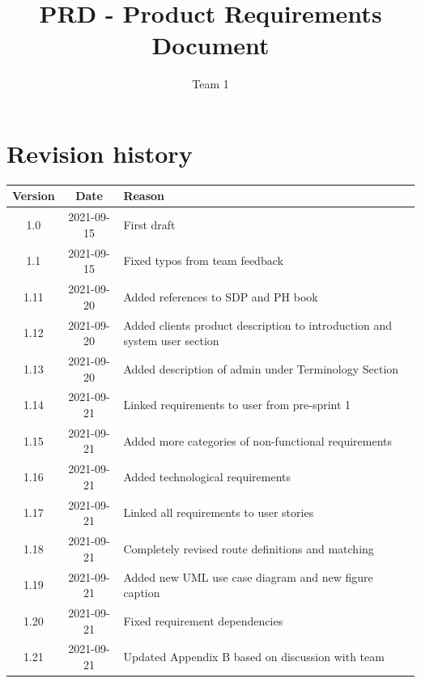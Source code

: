 \documentclass{article}
\title{PRD - Product Requirements Document}
\author{Team 1}
\begin{document}
\date{}
\maketitle
\thispagestyle{fancy}
\newpage

\tableofcontents

\section*{Revision history}
\begin{tabular}{ |c|c|l| } 
 \hline
 Version & Date & Reason \\ \hline \hline
 1.0 & 2021-09-15 & First draft \\ \hline
 1.1 & 2021-09-15 & Fixed typos from team feedback \\ \hline
 1.11 & 2021-09-20 & Added references to SDP and PH book\\\hline
 1.12 & 2021-09-20 & Added clients product description to introduction and system user section \\\hline
 1.13 & 2021-09-20 & Added description of admin under Terminology Section\\\hline
 1.14 & 2021-09-21 & Linked requirements to user from pre-sprint 1\\\hline
 1.15 & 2021-09-21 & Added more categories of non-functional requirements\\\hline
 1.16 & 2021-09-21 & Added technological requirements\\\hline
 1.17 & 2021-09-21 & Linked all requirements to user stories\\\hline
 1.18 & 2021-09-21 & Completely revised route definitions and matching\\\hline
 1.19 & 2021-09-21 & Added new UML use case diagram and new figure caption\\\hline
 1.20 & 2021-09-21 & Fixed requirement dependencies\\\hline
 1.21 & 2021-09-21 & Updated Appendix B based on discussion with team\\\hline
 
\end{tabular}

\newpage
\end{document}
